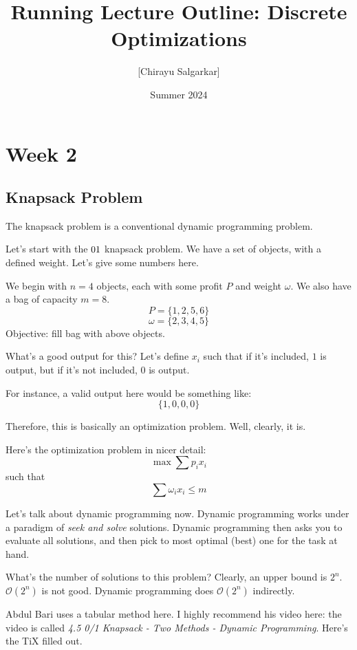 \documentclass[10pt, oneside]{article}
\title{Running Lecture Outline: Discrete Optimizations}
\author{[Chirayu Salgarkar]}
\date{Summer 2024}
\begin{document}
\maketitle
\tableofcontents

\vspace{.25in}

\section{Week 2}

\subsection{Knapsack Problem}

The knapsack problem is a conventional dynamic programming problem. 

Let's start with the $0 \/ 1$ knapsack problem. We have a set of objects, with a defined weight. Let's give some numbers here.

We begin with $n = 4$ objects, each with some profit $P$ and weight $\omega$. We also have a bag of capacity $m = 8$.
\[ P = \{1, 2, 5, 6\}\]
\[ \omega = \{2, 3, 4, 5\} \]
Objective: fill bag with above objects. 

What's a good output for this? Let's define $x_i$ such that if it's included, $1$ is output, but if it's not included, $0$ is output. 

For instance, a valid output here would be something like:
\[ \{1, 0, 0, 0\} \]

Therefore, this is basically an optimization problem. Well, clearly, it is. 

Here's the optimization problem in nicer detail: 
\[ \max \sum p_ix_i\]
such that
\[ \sum \omega_ix_i \leq m \]

Let's talk about dynamic programming now. 
Dynamic programming works under a paradigm of \textit{seek and solve} solutions. Dynamic programming then asks you to evaluate all solutions, and then pick to most optimal (best) one for the task at hand.

What's the number of solutions to this problem? Clearly, an upper bound is $2^n$. 
$\mathcal{O}(2^n)$ is not good. Dynamic programming does $\mathcal{O}(2^n)$ indirectly. 

Abdul Bari uses a tabular method here. I highly recommend his video here: the video is called \textit{4.5 0/1 Knapsack - Two Methods - Dynamic Programming}. Here's the TiX filled out. 
\end{document}
